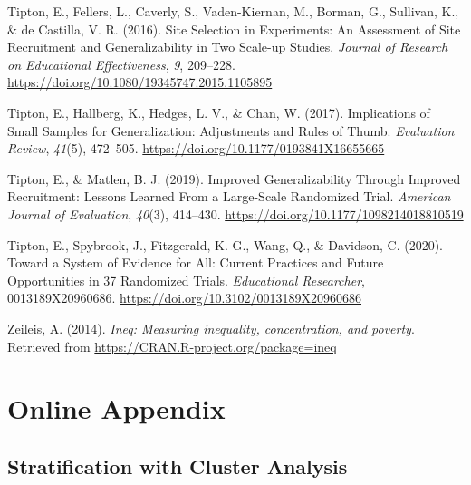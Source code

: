 \documentclass[
  english,
  man,floatsintext]{apa6}
\newlength{\cslhangindent}
\newlength{\cslentryspacingunit} %
\newenvironment{CSLReferences}[2] %
 {%
  \setlength{\parindent}{0pt}
  \ifodd #1
  \let\oldpar\par
  \def\par{\hangindent=\cslhangindent\oldpar}
  \fi
  \setlength{\parskip}{#2\cslentryspacingunit}
 }%
 {}
\begin{document}
\begin{CSLReferences}{1}{0}
\leavevmode{}%
Tipton, E., Fellers, L., Caverly, S., Vaden-Kiernan, M., Borman, G., Sullivan, K., \& de Castilla, V. R. (2016). Site {Selection} in {Experiments}: {An Assessment} of {Site Recruitment} and {Generalizability} in {Two Scale}-up {Studies}. \emph{Journal of Research on Educational Effectiveness}, \emph{9}, 209--228. \url{https://doi.org/10.1080/19345747.2015.1105895}

\leavevmode{}%
Tipton, E., Hallberg, K., Hedges, L. V., \& Chan, W. (2017). Implications of {Small Samples} for {Generalization}: {Adjustments} and {Rules} of {Thumb}. \emph{Evaluation Review}, \emph{41}(5), 472--505. \url{https://doi.org/10.1177/0193841X16655665}

\leavevmode{}%
Tipton, E., \& Matlen, B. J. (2019). Improved {Generalizability Through Improved Recruitment}: {Lessons Learned From} a {Large}-{Scale Randomized Trial}. \emph{American Journal of Evaluation}, \emph{40}(3), 414--430. \url{https://doi.org/10.1177/1098214018810519}

\leavevmode{}%
Tipton, E., Spybrook, J., Fitzgerald, K. G., Wang, Q., \& Davidson, C. (2020). Toward a {System} of {Evidence} for {All}: {Current Practices} and {Future Opportunities} in 37 {Randomized Trials}. \emph{Educational Researcher}, 0013189X20960686. \url{https://doi.org/10.3102/0013189X20960686}

\leavevmode{}%
Zeileis, A. (2014). \emph{Ineq: Measuring inequality, concentration, and poverty}. Retrieved from \url{https://CRAN.R-project.org/package=ineq}

\end{CSLReferences}

\endgroup

\newpage

\hypertarget{online-appendix}{%
\section{Online Appendix}\label{online-appendix}}

\hypertarget{stratification-with-cluster-analysis}{%
\subsection{Stratification with Cluster Analysis}\label{stratification-with-cluster-analysis}}
\end{document}
